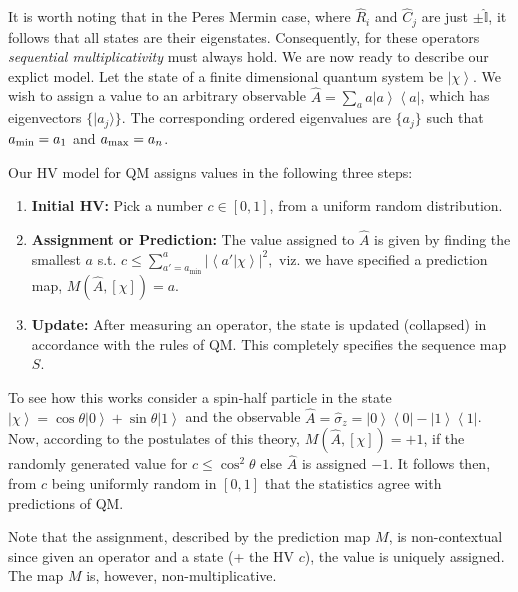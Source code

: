\documentclass[british,aps,prl,superscriptaddress,nofootinbib,times,reprint]{revtex4-1}
\theoremstyle{plain}
\theoremstyle{plain}
\theoremstyle{definition}
\theoremstyle{remark}
\theoremstyle{remark}
\theoremstyle{remark}
\theoremstyle{plain}
\theoremstyle{plain}
\theoremstyle{plain}
\theoremstyle{definition}
\theoremstyle{definition}
\begin{document}
It is worth noting that in the Peres Mermin
case, where $\hat{R}_{i}$ and $\hat{C}_{j}$ are
just $\pm\hat{\mathbb{I}}$, it follows that all
states are their eigenstates. Consequently, for
these operators \emph{sequential multiplicativity}
must always hold.
We are now ready to describe our explict model.
Let the state of a finite dimensional quantum system
be $\left|\chi\right\rangle $. We wish to
assign a value to an arbitrary observable 
$\hat{A}=\sum_{a}a\left|a\right\rangle
\left\langle a\right|$, which has 
eigenvectors $\{ \vert
a_j\rangle \}$. The corresponding ordered eigenvalues are $\{a_j\}$ such that 
$a_{\rm min}=a_1$
and 
$a_{\rm max}=a_n$.

Our HV model for QM assigns values in the following
three steps:
\setdefaultleftmargin{0pt}{}{}{}{}{}
\begin{enumerate}
\item
{\bf Initial HV:} Pick a number
$c\in[0,1]$, from a uniform random distribution.\
\item
{\bf
Assignment or Prediction:}
 The value assigned to
$\hat{A}$ is given by finding the smallest $a$
s.t.  $c\le\sum_{a'=a_{\text{min}}}^{a}\left|\left\langle
a'|\chi\right\rangle \right|^{2},$ viz. we have
specified a prediction map, $M(\hat{A},[\chi ])=a$.
\item
{\bf Update:} After measuring an operator, the state is
updated (collapsed) in accordance with the rules
of QM. This completely specifies the sequence map
$S$.
\end{enumerate}
To see how this works consider 
a spin-half particle in the state
$\left|\chi\right\rangle
=\cos\theta\left|0\right\rangle
+\sin\theta\left|1\right\rangle $ and the observable
$\hat{A}=\hat{\sigma}_{z}=\left|0\right\rangle
\left\langle 0\right|-\left|1\right\rangle
\left\langle 1\right|$. Now, according to the
postulates of this theory, $M(\hat{A},[\chi])=+1$, if
the randomly generated value for 
$c\le\cos^{2}\theta$ else $\hat{A}$ is assigned
$-1$. It follows then, from $c$ being uniformly
random in $[0,1]$ that the statistics agree with
predictions of QM.

Note that the assignment, described by the
prediction map $M$, is non-contextual since given
an operator and a state (+ the HV $c$), the value is
uniquely assigned. The map $M$ is, however,
non-multiplicative. 
\end{document}
